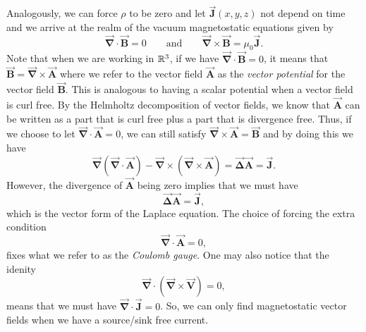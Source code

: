 \documentclass[12pt]{article} %
\newcommand{\grad}{\boldsymbol{\vec{\nabla}}}
\newcommand{\vecfieldB}{\boldsymbol{\vec{B}}}
\newcommand{\vecfieldJ}{\boldsymbol{\vec{J}}}
\newcommand{\veclaplace}{\boldsymbol{\vec{\Delta}}}
\newcommand{\vecfieldV}{\boldsymbol{\vec{V}}}
\newcommand{\vecfieldA}{\boldsymbol{\vec{A}}}
\begin{document}
\begin{solution}
\begin{enumerate}[(a)]
    Analogously, we can force $\rho$ to be zero and let $\vecfieldJ(x,y,z)$ not depend on time and we arrive at the realm of the vacuum magnetostatic equations given by
    \[
        \grad \cdot \vecfieldB = 0 \qquad \textrm{and} \qquad \grad \times \vecfieldB = \mu_0 \vecfieldJ.
    \]
    Note that when we are working in $\mathbb{R}^3$, if we have $\grad \cdot \vecfieldB=0$, it means that $\vecfieldB = \grad \times \vecfieldA$ where we refer to the vector field $\vecfieldA$ as the \emph{vector potential} for the vector field $\vecfieldB$.  This is analogous to having a scalar potential when a vector field is curl free. By the Helmholtz decomposition of vector fields, we know that $\vecfieldA$ can be written as a part that is curl free plus a part that is divergence free. Thus, if we choose to let $\grad \cdot \vecfieldA=0$, we can still satisfy $\grad \times \vecfieldA = \vecfieldB$ and by doing this we have
    \[
    \grad \left(\grad \cdot \vecfieldA\right) - \grad \times \left(\grad \times \vecfieldA\right)= \veclaplace \vecfieldA = \vecfieldJ.
    \]
    However, the divergence of $\vecfieldA$ being zero implies that we must have
    \[
    \veclaplace \vecfieldA = \vecfieldJ,
    \]
    which is the vector form of the Laplace equation.  The choice of forcing the extra condition
    \[
    \grad \cdot \vecfieldA=0,
    \]
    fixes what we refer to as the \emph{Coulomb gauge}.  One may also notice that the idenity
    \[
    \grad \cdot \left( \grad \times \vecfieldV \right) = 0,
    \]
    means that we must have $\grad \cdot \vecfieldJ=0$.  So, we can only find magnetostatic vector fields when we have a source/sink free current.
    

\end{enumerate}
\end{solution}
\end{document}
